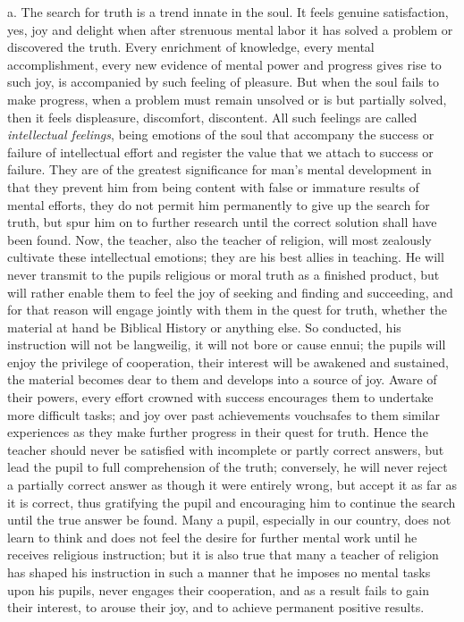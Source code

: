 a. The search for truth is a trend innate in the soul. It feels genuine satisfaction, yes, joy and delight when after strenuous mental labor it has solved a problem or discovered the truth. Every enrichment of knowledge, every mental accomplishment, every new evidence of mental power and progress gives rise to such joy, is accompanied by such feeling of pleasure. But when the soul fails to make progress, when a problem must remain unsolved or is but partially solved, then it feels displeasure, discomfort, discontent. All such feelings are called \emph{intellectual feelings}, being emotions of the soul that accompany the success or failure of intellectual effort and register the value that we attach to success or failure. They are of the greatest significance for man’s mental development in that they prevent him from being content with false or immature results of mental efforts, they do not permit him permanently to give up the search for truth, but spur him on to further research until the correct solution shall have been found. Now, the teacher, also the teacher of religion, will most zealously cultivate these intellectual emotions; they are his best allies in teaching. He will never transmit to the pupils religious or moral truth as a finished product, but will rather enable them to feel the joy of seeking and finding and succeeding, and for that reason will engage jointly with them in the quest for truth, whether the material at hand be Biblical History or anything else. So conducted, his instruction will not be langweilig, it will not bore or cause ennui; the pupils will enjoy the privilege of cooperation, their interest will be awakened
and sustained, the material becomes dear to them and develops into a source of joy. Aware of their powers, every effort crowned with success encourages them to undertake more difficult tasks; and joy over past achievements vouchsafes to them similar experiences as they make further progress in their quest for truth. Hence the teacher should never be satisfied with incomplete or partly correct answers, but lead the pupil to full comprehension of the truth; conversely, he will never reject a partially correct answer as though it were entirely wrong, but accept it as far as it is correct, thus gratifying the pupil and encouraging him to continue the search until the true answer be found. Many a pupil, especially in our country, does not learn to think and does not feel the desire for further mental work until he receives religious instruction; but it is also true that many a teacher of religion has shaped his instruction in such a manner that he imposes no mental tasks upon his pupils, never engages their cooperation, and as a result fails to gain their interest, to arouse their joy, and to achieve permanent positive results.

